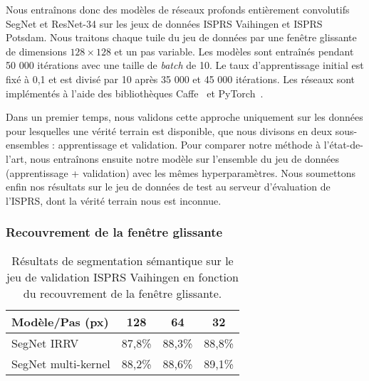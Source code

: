 Nous entraînons donc des modèles de réseaux profonds entièrement convolutifs SegNet et ResNet-34 sur les jeux de données \gls{ISPRS} Vaihingen et \gls{ISPRS} Potsdam.
Nous traitons chaque tuile du jeu de données par une fenêtre glissante de dimensions $128 \times 128$ et un pas variable. Les modèles sont entraînés pendant 50 000 itérations avec une taille de \emph{batch} de 10. Le taux d'apprentissage initial est fixé à 0,1 et est divisé par 10 après 35 000 et 45 000 itérations.
Les réseaux sont implémentés à l'aide des bibliothèques \gls{Caffe}~\cite{jia_caffe_2014} et \gls{PyTorch}~\cite{noauthor_pytorch_2016}.

Dans un premier temps, nous validons cette approche uniquement sur les données pour lesquelles une vérité terrain est disponible, que nous divisons en deux sous-ensembles : apprentissage et validation. Pour comparer notre méthode à l'état-de-l'art, nous entraînons ensuite notre modèle sur l'ensemble du jeu de données (apprentissage + validation) avec les mêmes hyperparamètres. Nous soumettons enfin nos résultats sur le jeu de données de test au serveur d'évaluation de l'\gls{ISPRS}, dont la vérité terrain nous est inconnue.

\subsubsection{Recouvrement de la fenêtre glissante}

\begin{table}[t]
  \centering
  \caption{Résultats de segmentation sémantique sur le jeu de validation \gls{ISPRS} Vaihingen en fonction du recouvrement de la fenêtre glissante.}
  \setlength{\tabcolsep}{15pt}
  \begin{tabularx}{0.8\textwidth}{ Y c c c }
  \toprule
  Modèle/Pas (px) & 128 & 64 & 32\\
  \midrule
  SegNet \gls{IRRV} & 87,8\% & 88,3\% & 88,8\%\\
  SegNet multi-kernel & 88,2\% & 88,6\% & 89,1\%\\
  \bottomrule
  \end{tabularx}
  \label{tab:vaihingen_stride}
\end{table}

